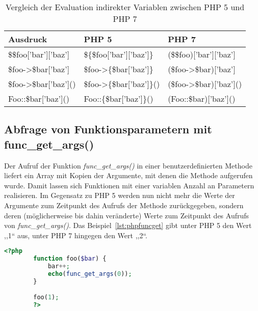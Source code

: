     \begin{table}[]
        \caption{Vergleich der Evaluation indirekter Variablen zwischen PHP 5 und PHP 7}
        \label{tab:indirect-expressions}
        \begin{tabular}{lll}
        \textbf{Ausdruck}               & \textbf{PHP 5}                    & \textbf{PHP 7}                \\ \hline
        \$\$foo{[}'bar'{]}{[}'baz'{]}   & \$\{\$foo{[}'bar'{]}{[}'baz'{]}\} & (\$\$foo){[}'bar'{]}{[}'baz'{]} \\ \hline
        \$foo->\$bar{[}'baz'{]}         & \$foo->\{\$bar{[}'baz'{]}\}       & (\$foo->\$bar){[}'baz'{]}       \\ \hline
        \$foo->\$bar{[}'baz'{]}()       & \$foo->\{\$bar{[}'baz'{]}\}()     & (\$foo->\$bar){[}'baz'{]}()     \\ \hline
        Foo::\$bar{[}'baz'{]}()         & Foo::\{\$bar{[}'baz'{]}\}()       & (Foo::\$bar){[}'baz'{]}()    
        \end{tabular}
    \end{table}

    \subsection{Abfrage von Funktionsparametern mit func\_get\_args()}
    Der Aufruf der Funktion \textit{func\_get\_args()} in einer benutzerdefinierten Methode liefert ein Array mit Kopien der 
    Argumente, mit denen die Methode aufgerufen wurde. Damit lassen sich Funktionen mit einer variablen Anzahl an Parametern 
    realisieren. Im Gegensatz zu \ac{PHP} 5 werden nun nicht mehr die Werte der Argumente zum Zeitpunkt des Aufrufs der Methode 
    zurückgegeben, sondern deren (möglicherweise bis dahin veränderte) Werte zum Zeitpunkt des Aufrufs von 
    \textit{func\_get\_args()}. Das Beispiel~\ref{lst:phpfuncget} gibt unter \ac{PHP} 5 den Wert ,,1`` aus, unter \ac{PHP} 7 
    hingegen den Wert ,,2``.

    \begin{lstlisting}[language=php, caption={Beispiel des Aufrufs von func\_get\_args()}, label={lst:phpfuncget}]
        <?php
        function foo($bar) {
            bar++;
            echo(func_get_args(0));
        }

        foo(1);
        ?>
    \end{lstlisting}


